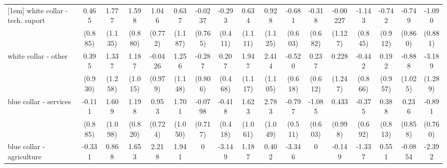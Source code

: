 {\begin{tabular}{l*{16}{c}}
[1em]
white collar - tech. suport&       0.465         &       1.777         &       1.598         &       1.046         &       0.637         &     -0.0237         &      -0.293         &       0.634         &       0.928         &      -0.681         &      -0.318         &    -0.00227         &      -1.143         &      -0.742         &      -0.749         &      -1.090         \\
                    &     (0.885)         &     (1.135)         &     (0.880)         &     (0.772)         &     (1.187)         &     (0.765)         &     (0.411)         &     (1.111)         &     (1.125)         &     (0.603)         &     (0.682)         &     (1.127)         &     (0.845)         &     (0.912)         &     (0.860)         &     (0.881)         \\
[1em]
white collar - other&       0.395         &       1.337         &       1.187         &     -0.0426         &       1.256         &      -0.287         &       0.207         &       1.947         &       2.414\sym{*}  &      -0.520         &       0.237         &       0.228         &      -0.442         &       0.192         &      -0.888         &      -3.189\sym{*}  \\
                    &     (0.930)         &     (1.258)         &     (1.015)         &     (0.979)         &     (1.148)         &     (0.806)         &     (0.468)         &     (1.117)         &     (1.105)         &     (0.618)         &     (0.612)         &     (1.247)         &     (0.866)         &     (0.957)         &     (1.025)         &     (1.289)         \\
[1em]
blue collar - services&      -0.111         &       1.609         &       1.198         &       0.953         &       1.701         &     -0.0798         &      -0.418         &       1.623         &       2.783\sym{**} &      -0.797         &      -1.085         &       0.433         &      -0.375         &       0.388         &       0.236         &      -0.891         \\
                    &     (0.885)         &     (1.098)         &     (0.820)         &     (0.724)         &     (1.050)         &     (0.717)         &     (0.418)         &     (1.061)         &     (1.049)         &     (0.511)         &     (0.603)         &     (0.998)         &     (0.692)         &     (0.813)         &     (0.858)         &     (0.760)         \\
[1em]
blue collar - agriculture&      -0.331         &       0.868         &       1.653         &       2.218\sym{*}  &       1.941         &           0         &      -3.149\sym{**} &       1.187         &       0.402         &      -3.346\sym{**} &           0         &      -0.149         &      -1.337         &       0.551         &     -0.0854         &      -2.392\sym{*}  \\

\end{tabular}}
